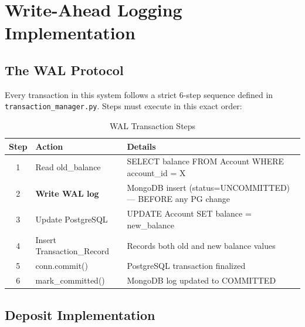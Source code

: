 
\chapter{Write-Ahead Logging Implementation}

\section{The WAL Protocol}

Every transaction in this system follows a strict 6-step sequence defined
in \texttt{transaction\_manager.py}. Steps must execute in this exact order:

\begin{table}[H]
\centering
\caption{WAL Transaction Steps}
\begin{tabularx}{\textwidth}{clX}
\toprule
\textbf{Step} & \textbf{Action} & \textbf{Details} \\
\midrule
1 & Read old\_balance & SELECT balance FROM Account WHERE account\_id = X \\
2 & \textbf{Write WAL log} & MongoDB insert (status=UNCOMMITTED) --- BEFORE any PG change \\
3 & Update PostgreSQL & UPDATE Account SET balance = new\_balance \\
4 & Insert Transaction\_Record & Records both old and new balance values \\
5 & conn.commit() & PostgreSQL transaction finalized \\
6 & mark\_committed() & MongoDB log updated to COMMITTED \\
\bottomrule
\end{tabularx}
\end{table}

\section{Deposit Implementation}

